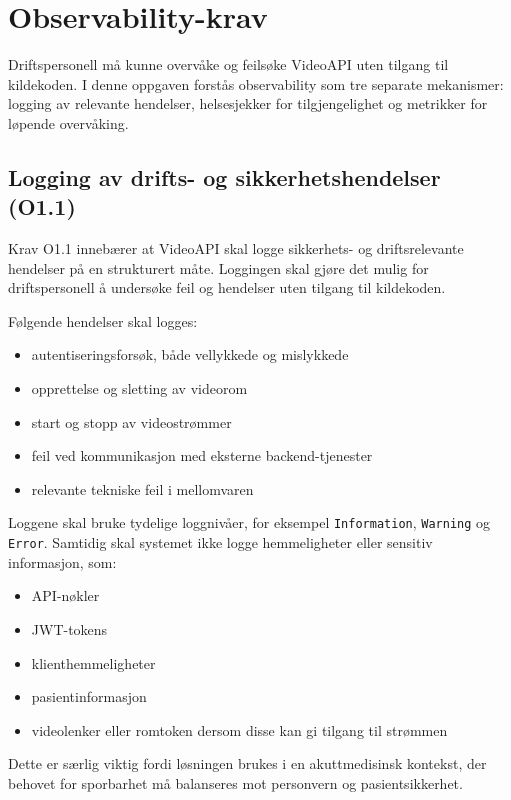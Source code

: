 \section{Observability-krav}
\label{sec:krav-observability}

Driftspersonell må kunne overvåke og feilsøke VideoAPI uten 
tilgang til kildekoden. I denne oppgaven forstås observability 
som tre separate mekanismer: logging av relevante hendelser, 
helsesjekker for tilgjengelighet og metrikker for løpende 
overvåking.

\subsection{Logging av drifts- og sikkerhetshendelser (O1.1)}
\label{subsec:krav-o11}

Krav O1.1 innebærer at VideoAPI skal logge sikkerhets- og 
driftsrelevante hendelser på en strukturert måte. Loggingen skal 
gjøre det mulig for driftspersonell å undersøke feil og hendelser 
uten tilgang til kildekoden.

Følgende hendelser skal logges:

\begin{itemize}
    \item autentiseringsforsøk, både vellykkede og mislykkede
    \item opprettelse og sletting av videorom
    \item start og stopp av videostrømmer
    \item feil ved kommunikasjon med eksterne backend-tjenester
    \item relevante tekniske feil i mellomvaren
\end{itemize}

Loggene skal bruke tydelige loggnivåer, for eksempel 
\texttt{Information}, \texttt{Warning} og \texttt{Error}. Samtidig skal 
systemet ikke logge hemmeligheter eller sensitiv informasjon, som:

\begin{itemize}
    \item API-nøkler
    \item JWT-tokens
    \item klienthemmeligheter
    \item pasientinformasjon
    \item videolenker eller romtoken dersom disse kan gi tilgang til strømmen
\end{itemize}

Dette er særlig viktig fordi løsningen brukes i en akuttmedisinsk 
kontekst, der behovet for sporbarhet må balanseres mot personvern 
og pasientsikkerhet.

